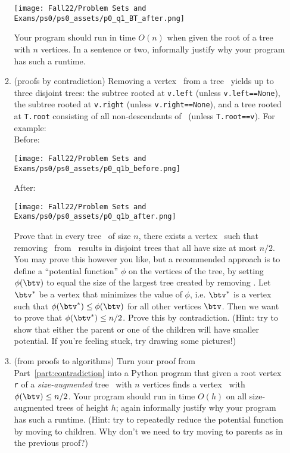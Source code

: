 \documentclass[11pt]{article}
\begin{document}
\begin{enumerate}
\begin{enumerate}
 \texttt{[image: Fall22/Problem Sets and Exams/ps0/ps0\_assets/p0\_q1\_BT\_after.png]}

 Your program should run in time $O(n)$ when given the root of a tree with $n$ vertices. In a sentence or two, informally justify why your program has such a runtime. 
 
 \item (proofs by contradiction) \label{part:contradiction}
 Removing a vertex \btv\ from a tree \treeT\ yields up to three disjoint trees: the subtree rooted at
 \texttt{v.left} (unless \texttt{v.left==None}), the subtree rooted at
 \texttt{v.right} (unless \texttt{v.right==None}), and a tree rooted at \texttt{T.root} consisting of all non-descendants of \btv\ (unless \texttt{T.root==v}).  For example:
 \\

 Before:
 
 \texttt{[image: Fall22/Problem Sets and Exams/ps0/ps0\_assets/p0\_q1b\_before.png]}
 
 
 After:
 
  \texttt{[image: Fall22/Problem Sets and Exams/ps0/ps0\_assets/p0\_q1b\_after.png]}

  Prove that in every tree \treeT\ of size $n$, there exists a vertex \btv\ such that removing \btv\ from \treeT\ results in disjoint trees that all have size at most $n/2$.  \\
  
  You may prove this however you like, but a recommended approach is to define a ``potential function'' $\phi$ on the vertices of the tree, by setting $\phi(\btv)$ to equal the size of the largest tree created by removing \btv.  Let $\btv^*$ be a vertex that minimizes the value of $\phi$, i.e. $\btv^*$ is a vertex such that $\phi(\btv^*) \le \phi(\btv)$ for all other vertices $\btv$. Then we want to prove that $\phi(\btv^*)\leq n/2$.  Prove this by contradiction.  (Hint: try to show that either the parent or one of the children will have smaller potential. If you're feeling stuck, try drawing some pictures!)
 
 \item (from proofs to algorithms)  Turn your proof from Part~\ref{part:contradiction} into a Python program that given a root vertex \texttt{r} of a {\em size-augmented} tree \treeT\ with $n$ vertices finds a vertex \btv\ with $\phi(\btv)\leq n/2$. Your program should run in time $O(h)$ on all size-augmented trees of height $h$; again informally justify why your program has such a runtime. (Hint: try to repeatedly reduce the potential function by moving to children. Why don't we need to try moving to parents as in the previous proof?)
 \end{enumerate}
 

\end{enumerate}
\end{document}
